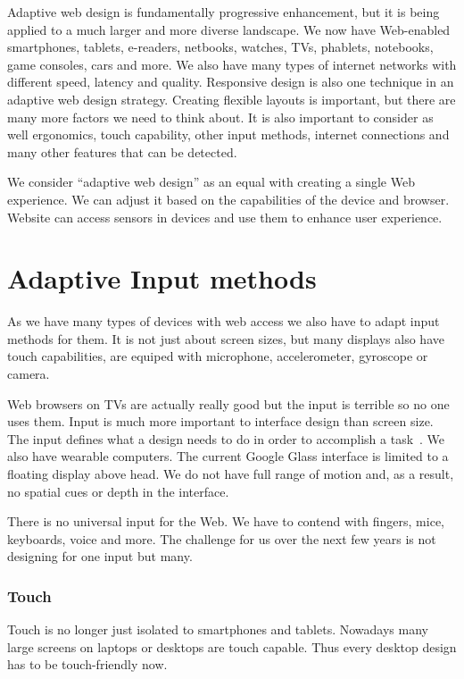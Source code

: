 \documentclass{iitsrc}
\begin{document}
Adaptive web design is fundamentally progressive enhancement, but it is being applied to a much larger and more diverse landscape. We now have Web-enabled smartphones, tablets, e-readers, netbooks, watches, TVs, phablets, notebooks, game consoles, cars and more. We also have many types of internet networks with different speed, latency and quality. Responsive design is also one technique in an adaptive web design strategy. Creating flexible layouts is important, but there are many more factors we need to think about. It is also important to consider as well ergonomics, touch capability, other input methods, internet connections and many other features that can be detected.

We consider ``adaptive web design'' as an equal with creating a single Web experience. We can adjust it based on the capabilities of the device and browser. Website can access sensors in devices and use them to enhance user experience.


\section{Adaptive Input methods}

As we have many types of devices with web access we also have to adapt input methods for them. It is not just about screen sizes, but many displays also have touch capabilities, are equiped with microphone, accelerometer, gyroscope or camera.

Web browsers on TVs are actually really good but the input is terrible so no one uses them. Input is much more important to interface design than screen size. The input defines what a design needs to do in order to accomplish a task~\cite{adaptiveinput}. We also have wearable computers. The current Google Glass interface is limited to a floating display above head. We do not have full range of motion and, as a result, no spatial cues or depth in the interface.

There is no universal input for the Web. We have to contend with fingers, mice, keyboards, voice and more. The challenge for us over the next few years is not designing for one input but many.

\subsubsection*{Touch} %
\label{sub:touch}

Touch is no longer just isolated to smartphones and tablets. Nowadays many large screens on laptops or desktops are touch capable. Thus every desktop design has to be touch-friendly now.
\end{document}
